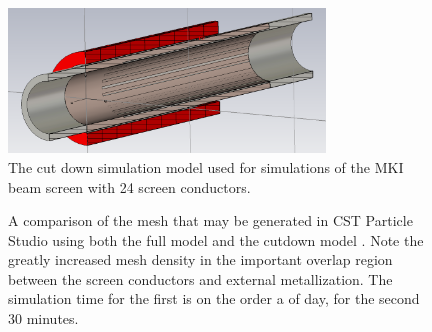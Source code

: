 \begin{figure}
\begin{center}
\includegraphics[width=0.75\textwidth]{LHC_MKI/figures/cutDownModel.png}
\end{center}
\caption{The cut down simulation model used for simulations of the MKI beam screen with 24 screen conductors.}
\label{fig:cut-down-mki-cap-end}
\end{figure}

\begin{figure}
\begin{center}
\end{center}
\caption{A comparison of the mesh that may be generated in CST Particle Studio using both the full model  and the cutdown model . Note the greatly increased mesh density in the important overlap region between the screen conductors and external metallization. The simulation time for the first is on the order a of day, for the second 30 minutes.}
\label{fig:mki-mesh-com-cst}
\end{figure}

